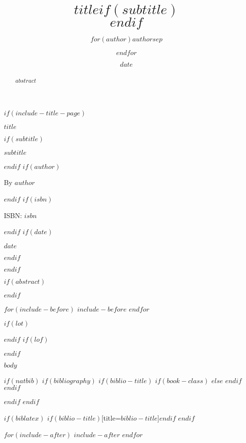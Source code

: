 \documentclass[$if(fontsize)$$fontsize$,$endif$$if(lang)$$babel-lang$,$endif$$if(papersize)$$papersize$paper,$endif$$for(classoption)$$classoption$$sep$,$endfor$]{$documentclass$}
\title{$title$$if(subtitle)$\\\vspace{0.5em}{\large $subtitle$}$endif$}
\author{$for(author)$$author$$sep$ \and $endfor$}
\date{$date$}
\newcommand{\customtitlepage}{
  \begin{titlepage}
    \pagestyle{empty}
    \begin{center}
    \vspace*{2cm}
    {\Huge\bfseries $title$\par}
    $if(subtitle)$
    \vspace{0.5cm}
    {\Large $subtitle$\par}
    $endif$
    \vspace{2cm}
    $if(author)$
    {\large By $author$\par}
    $endif$
    $if(isbn)$
    \vspace{0.5cm}
    {\large ISBN: $isbn$\par}
    $endif$
    $if(date)$
    \vspace{1cm}
    {\large $date$\par}
    $endif$
    \end{center}
  \end{titlepage}
}
\begin{document}
\frontmatter
{}  %
\pagestyle{plain}      %

$if(include-title-page)$
\customtitlepage
$endif$

$if(abstract)$
\begin{abstract}
$abstract$
\end{abstract}
$endif$

$for(include-before)$
$include-before$
$endfor$


$if(lot)$
\listoftables
$endif$
$if(lof)$
\listoffigures
$endif$

$body$

$if(natbib)$
$if(bibliography)$
$if(biblio-title)$
$if(book-class)$
\renewcommand\bibname{$biblio-title$}
$else$
\renewcommand\refname{$biblio-title$}
$endif$
$endif$

$endif$
$endif$

$if(biblatex)$
\printbibliography$if(biblio-title)$[title=$biblio-title$]$endif$
$endif$

$for(include-after)$
$include-after$
$endfor$
\end{document}
